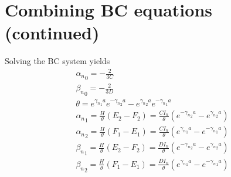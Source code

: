 \documentclass[11pt]{article}
\begin{document}
\section{Combining BC equations (continued)}
Solving the BC system yields
\begin{equation}\begin{aligned}
{\alpha_n}_0 = -\frac{2}{3 C} \\
{\beta_n}_0  = -\frac{2}{3 D} \\
\theta = e^{ {\gamma_n}_1 a} e^{-{\gamma_n}_2 a} - e^{ {\gamma_n}_2 a} e^{-{\gamma_n}_1 a} \\
{\alpha_n}_1 = \frac{H}{\theta} (E_2 - F_2) = \frac{C I_n}{\theta} (e^{-{\gamma_n}_2 a} - e^{ {\gamma_n}_2 a}) \\
{\alpha_n}_2 = \frac{H}{\theta} (F_1 - E_1) = \frac{C I_n}{\theta} (e^{ {\gamma_n}_1 a} - e^{-{\gamma_n}_1 a}) \\
{\beta_n}_1  = \frac{H}{\theta} (E_2 - F_2) = \frac{D I_n}{\theta} (e^{-{\gamma_n}_2 a} - e^{ {\gamma_n}_2 a}) \\
{\beta_n}_2  = \frac{H}{\theta} (F_1 - E_1) = \frac{D I_n}{\theta} (e^{ {\gamma_n}_1 a} - e^{-{\gamma_n}_1 a}) \\
\end{aligned} \end{equation}
\end{document}
